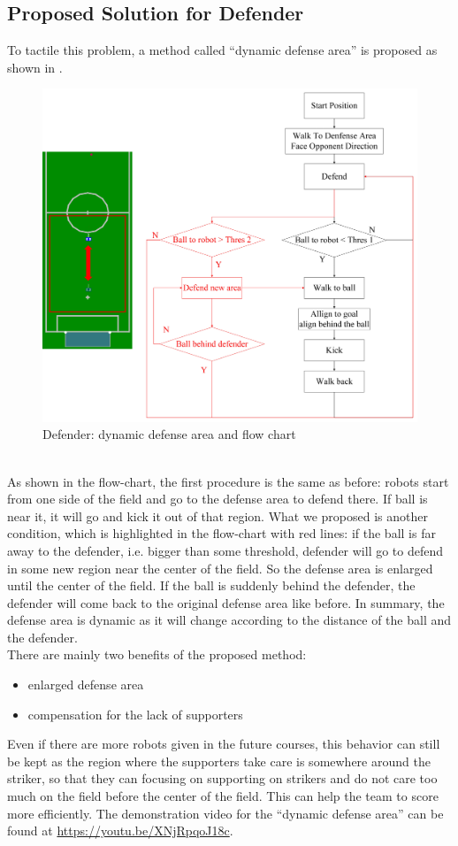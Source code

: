 \subsection{Proposed Solution for Defender}
To tactile this problem, a method called ``dynamic defense area'' is proposed as shown in .
\begin{figure}[!htb]
  \centering
  \includegraphics[width=\textwidth]{pics/Dy_DA}
  \caption{Defender: dynamic defense area and flow chart }
  \label{fig: DefFix}
\end{figure}\\
As shown in the flow-chart, the first procedure is the same as before: robots start from one side of the field and go to the defense area to defend there. If ball is near it, it will go and kick it out of that region. What we proposed is another condition, which is highlighted in the flow-chart with red lines: if the ball is far away to the defender, i.e. bigger than some threshold, defender will go to defend in some new region near the center of the field. So the defense area is enlarged until the center of the field. If the ball is suddenly behind the defender, the defender will come back to the original defense area like before. In summary, the defense area is dynamic as it will change according to the distance of the ball and the defender.\\
There are mainly two benefits of the proposed method:
\begin{itemize}
    \item enlarged defense area
    \item compensation for the lack of supporters
\end{itemize}
Even if there are more robots given in the future courses, this behavior can still be kept as the region where the supporters take care is somewhere around the striker, so that they can focusing on supporting on strikers and do not care too much on the field before the center of the field. This can help the team to score more efficiently. The demonstration video for the ``dynamic defense area'' can be found at \url{https://youtu.be/XNjRpqoJ18c}.
\clearpage
